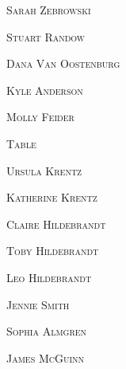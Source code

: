 \documentclass[12pt]{article}
\begin{document}
\vspace*{.15in}
\textsc{\Huge Sarah Zebrowski}

\vspace*{.15in}
\textsc{\Huge Stuart Randow}

\vspace*{.15in}
\textsc{\Huge Dana Van Oostenburg}

\vspace*{.15in}
\textsc{\Huge Kyle Anderson}

\vspace*{.15in}
\textsc{\Huge Molly Feider}

\vspace*{\fill}

\newpage

\vspace*{.25in}

\textsc{\Huge Table}
\vspace*{.3in}


\vspace*{\fill}

\textsc{\Huge Ursula Krentz}

\vspace*{.15in}
\textsc{\Huge Katherine Krentz}

\vspace*{.15in}
\textsc{\Huge Claire Hildebrandt}

\vspace*{.15in}
\textsc{\Huge Toby Hildebrandt}

\vspace*{.15in}
\textsc{\Huge Leo Hildebrandt}

\vspace*{.15in}
\textsc{\Huge Jennie Smith}

\vspace*{.15in}
\textsc{\Huge Sophia Almgren}

\vspace*{.15in}
\textsc{\Huge James McGuinn}


\vspace*{\fill}

\newpage
\end{document}
